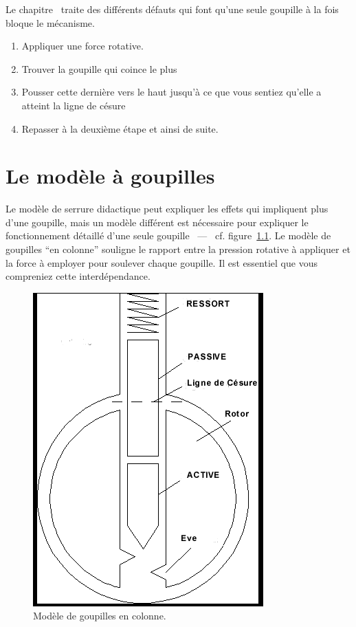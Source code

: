 \documentclass[a4paper,french,11pt,twoside]{report}
\begin{document}
Le chapitre~ traite des différents défauts qui font qu'une seule goupille à la fois bloque le mécanisme.

\begin{enumerate}
    \item{Appliquer une force rotative.}
    \item{Trouver la goupille qui coince le plus}
    \item{Pousser cette dernière vers le haut jusqu'à ce que vous sentiez qu'elle a atteint la ligne de césure}
    \item{Repasser à la deuxième étape et ainsi de suite. }
\end{enumerate}

\chapter{\label{chap:modele_goupilles}Le modèle à goupilles}

Le modèle de serrure didactique peut expliquer les effets qui impliquent plus d'une goupille, mais un modèle différent est nécessaire pour expliquer le fonctionnement détaillé d'une seule goupille ~---~ cf. figure~\ref{modele_goupilles_colonne}. Le modèle de goupilles \enquote{en colonne} souligne le rapport entre la pression rotative à appliquer et la force à employer pour soulever chaque goupille. Il est essentiel que vous compreniez cette interdépendance.

\begin{figure}[h]
  \begin{center}
    \includegraphics[scale=0.6]{images/Image9}
    \caption{Modèle de goupilles en colonne.\label{modele_goupilles_colonne}}
  \end{center}
\end{figure}
\end{document}

